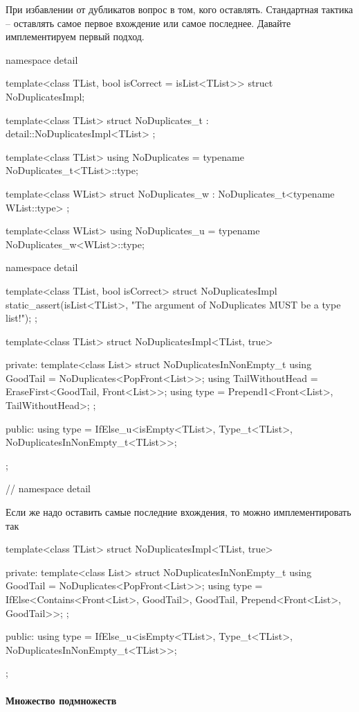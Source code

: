 При избавлении от дубликатов вопрос в том, кого оставлять.
Стандартная тактика -- оставлять самое первое вхождение или самое последнее.
Давайте имплементируем первый подход.
\begin{cppcode}
namespace detail {

template<class TList, bool isCorrect = isList<TList>>
struct NoDuplicatesImpl;
}

template<class TList>
struct NoDuplicates_t : detail::NoDuplicatesImpl<TList> {};

template<class TList>
using NoDuplicates = typename NoDuplicates_t<TList>::type;

template<class WList>
struct NoDuplicates_w : NoDuplicates_t<typename WList::type> {};

template<class WList>
using NoDuplicates_u = typename NoDuplicates_w<WList>::type;

namespace detail {

template<class TList, bool isCorrect>
struct NoDuplicatesImpl {
  static_assert(isList<TList>,
                "The argument of NoDuplicates MUST be a type list!");
};

template<class TList>
struct NoDuplicatesImpl<TList, true> {
private:
  template<class List>
  struct NoDuplicatesInNonEmpty_t {
    using GoodTail = NoDuplicates<PopFront<List>>;
    using TailWithoutHead = EraseFirst<GoodTail, Front<List>>;
    using type = Prepend1<Front<List>, TailWithoutHead>;
  };

public:
  using type =
      IfElse_u<isEmpty<TList>, Type_t<TList>, NoDuplicatesInNonEmpty_t<TList>>;
};
} // namespace detail
\end{cppcode}
Если же надо оставить самые последние вхождения, то можно имплементировать так
\begin{cppcode}
template<class TList>
struct NoDuplicatesImpl<TList, true> {
private:
  template<class List>
  struct NoDuplicatesInNonEmpty_t {
    using GoodTail = NoDuplicates<PopFront<List>>;
    using type = 
        IfElse<Contains<Front<List>, GoodTail>, GoodTail, Prepend<Front<List>, GoodTail>>;
  };

public:
  using type = IfElse_u<isEmpty<TList>, Type_t<TList>, NoDuplicatesInNonEmpty_t<TList>>;
};
\end{cppcode}

\paragraph{Множество подмножеств}

